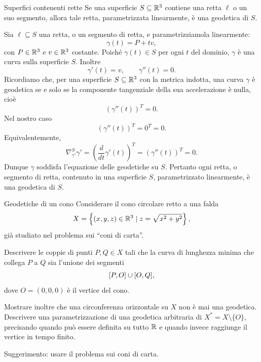 \documentclass[a4paper]{article}
\begin{document}
\begin{snippetproposition}{Superfici contenenti rette}
    Se una superficie \(S\subseteq\mathbb{R}^3\) contiene una retta \(\ell\) o un suo segmento,
    allora tale retta, parametrizzata linearmente, è una geodetica di \(S\).
\end{snippetproposition}

\begin{snippetproof}{}
    Sia \(\ell\subseteq S\) una retta, o un segmento di retta, e parametrizziamola linearmente:
    \[
        \gamma(t)=P+tv,
    \]
    con \(P\in\mathbb{R}^3\) e \(v\in\mathbb{R}^3\) costante. Poiché \(\gamma(t)\in S\) per ogni \(t\) del dominio, \(\gamma\) è una curva sulla superficie \(S\). Inoltre
    \[
        \gamma'(t)=v,
        \qquad
        \gamma''(t)=0.
    \]
    Ricordiamo che, per una superficie \(S\subseteq\mathbb{R}^3\) con la metrica indotta, una curva \(\gamma\) è geodetica se e solo se la componente tangenziale della sua accelerazione è nulla, cioè
    \[
        \left(\gamma''(t)\right)^T=0.
    \]
    Nel nostro caso
    \[
        \left(\gamma''(t)\right)^T=0^T=0.
    \]
    Equivalentemente,
    \[
        \nabla^S_{\gamma'}\gamma'
        =
        \left(\frac{d}{dt}\gamma'(t)\right)^T
        =
        \left(\gamma''(t)\right)^T
        =
        0.
    \]
    Dunque \(\gamma\) soddisfa l'equazione delle geodetiche su \(S\). Pertanto ogni retta, o segmento di retta, contenuto in una superficie \(S\), parametrizzato linearmente, è una geodetica di \(S\).
\end{snippetproof}

\begin{snippetexercise}{Geodetiche di un cono}
    Considerare il cono circolare retto a una falda
    \[
        X=
        \left\{
            (x,y,z)\in\mathbb{R}^3
            \mid
            z=\sqrt{x^2+y^2}
        \right\},
    \]
    già studiato nel problema sui ``coni di carta''.

    Descrivere le coppie di punti \(P,Q\in X\) tali che la curva di
    lunghezza minima che collega \(P\) a \(Q\) sia l'unione dei segmenti
    \[
        [P,O]\cup[O,Q],
    \]
    dove \(O=(0,0,0)\) è il vertice del cono.

    Mostrare inoltre che una circonferenza orizzontale su \(X\) non è
    mai una geodetica. Descrivere una parametrizzazione di una
    geodetica arbitraria di \(X^*=X\setminus\{O\}\), precisando quando
    può essere definita su tutto \(\mathbb{R}\) e quando invece
    raggiunge il vertice in tempo finito.

    Suggerimento: usare il problema sui coni di carta.
\end{snippetexercise}
\end{document}
